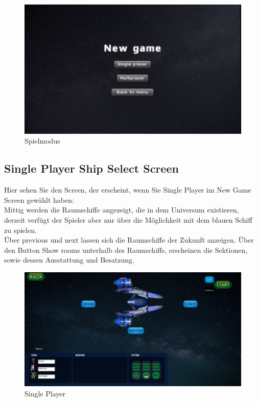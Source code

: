 \documentclass[fontsize=12pt,paper=a4,twoside]{scrartcl}
\begin{document}
\begin{figure}[htp]
	\centering
	\includegraphics[width=1.00\linewidth]{pics/gamemodescreen.png}
	\caption{Spielmodus}
\end{figure}

\subsection{Single Player Ship Select Screen}

Hier sehen Sie den Screen, der erscheint, wenn Sie Single Player im New Game Screen gewählt haben:\\
Mittig werden die Raumschiffe angezeigt, die in dem Universum existieren, derzeit verfügt der Spieler aber nur über die Möglichkeit mit dem blauen Schiff zu spielen.\\
Über previous und next lassen sich die Raumschiffe der Zukunft anzeigen. Über den Button Show rooms unterhalb des Raumschiffs, erscheinen die Sektionen, sowie dessen Ausstattung
und Besatzung.

\begin{figure}[htp]
	\centering
	\includegraphics[width=1.00\linewidth]{pics/SinglePlayer01.png}
	\caption{Single Player}
\end{figure}
\end{document}
